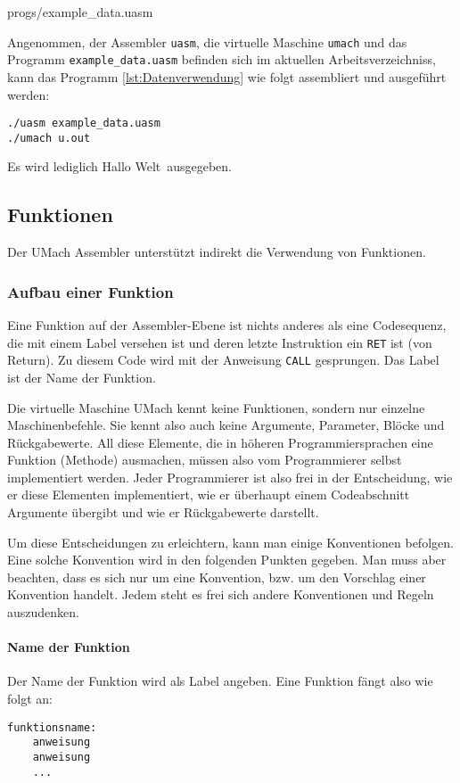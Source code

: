
{progs/example_data.uasm}

Angenommen, der Assembler \texttt{uasm}, die virtuelle Maschine
\texttt{umach} und das Programm \texttt{example\_data.uasm} befinden sich im
aktuellen Arbeitsverzeichniss, kann das Programm \ref{lst:Datenverwendung} 
wie folgt assembliert und ausgeführt werden:
\begin{lstlisting}
./uasm example_data.uasm
./umach u.out
\end{lstlisting}
Es wird lediglich \glqq Hallo Welt\grqq\ ausgegeben.



\subsection{Funktionen}

Der UMach Assembler unterstützt indirekt die Verwendung von Funktionen.

\subsubsection{Aufbau einer Funktion}

Eine Funktion auf der Assembler-Ebene ist nichts anderes als eine Codesequenz,
die mit einem Label versehen ist und deren letzte Instruktion ein \texttt{RET}
ist (von Return). Zu diesem Code wird mit der Anweisung \texttt{CALL}
gesprungen. Das Label ist der Name der Funktion.

Die virtuelle Maschine UMach kennt keine Funktionen, sondern nur einzelne
Maschinenbefehle. Sie kennt also auch keine Argumente, Parameter, Blöcke und
Rückgabewerte. All diese Elemente, die in höheren Programmiersprachen eine
Funktion (Methode) ausmachen, müssen also vom Programmierer selbst implementiert
werden. Jeder Programmierer ist also frei in der Entscheidung, wie er diese
Elementen implementiert, wie er überhaupt einem Codeabschnitt Argumente übergibt
und wie er Rückgabewerte darstellt. 

Um diese Entscheidungen zu erleichtern, kann man einige Konventionen befolgen.
Eine solche Konvention wird in den folgenden Punkten gegeben. Man muss aber 
beachten, dass es sich nur um eine Konvention, bzw. um den Vorschlag einer
Konvention handelt. Jedem steht es frei sich andere Konventionen und Regeln
auszudenken.

\paragraph{Name der Funktion}
Der Name der Funktion wird als Label angeben. Eine Funktion fängt also wie folgt
an:
\begin{lstlisting}
funktionsname:
    anweisung
    anweisung
    ...
\end{lstlisting}


